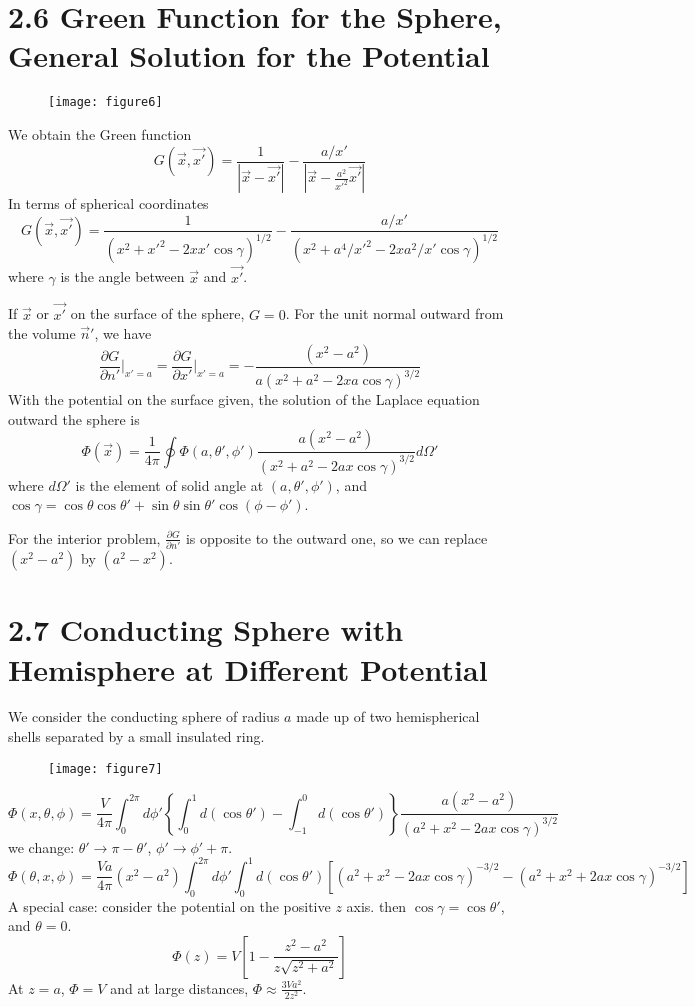 \documentclass{article}
\begin{document}
	\section*{2.6 Green Function for the Sphere, General Solution for the Potential}
	\begin{figure}[h]
		\centering
		\texttt{[image: figure6]}
		\caption{}
		\label{fig:figure6}
	\end{figure}
	
	
	We obtain the Green function
	$$
	G(\vec{x}, \vec{x'}) = \frac{1}{|\vec{x} - \vec{x'}|} - \frac{a/x'}{|\vec{x} - \frac{a^2}{x'^2}\vec{x'}|}
	$$
	In terms of spherical coordinates
	$$
	G(\vec{x}, \vec{x'}) = \frac{1}{(x^2+x'^2-2xx'\cos\gamma)^{1/2}} - \frac{a/x'}{(x^2+a^4/x'^2 - 2xa^2/x' \cos\gamma)^{1/2}}
	$$
	where $\gamma$ is the angle between $\vec{x}$ and $\vec{x'}$.
	
	If $\vec{x}$ or $\vec{x'}$ on the surface of the sphere, $G=0$. For the unit normal outward from the volume $\vec{n}'$, we have
	$$
	\frac{\partial G}{\partial n'}\bigg|_{x'=a} = \frac{\partial G}{\partial x'}\bigg|_{x'=a} = -\frac{(x^2-a^2)}{a(x^2+a^2-2xa\cos\gamma)^{3/2}}
	$$
	With the potential on the surface given, the solution of the Laplace equation outward the sphere is
	$$
	\Phi(\vec{x}) = \frac{1}{4\pi} \oint \Phi(a, \theta', \phi') \frac{a(x^2-a^2)}{(x^2+a^2-2ax\cos\gamma)^{3/2}} d\Omega'
	$$
	where $d\Omega'$ is the element of solid angle at $(a, \theta', \phi')$, and $\cos\gamma = \cos\theta\cos\theta' + \sin\theta\sin\theta'\cos(\phi-\phi')$.
	
	For the interior problem, $\frac{\partial G}{\partial n'}$ is opposite to the outward one, so we can replace $(x^2-a^2)$ by $(a^2-x^2)$.
	
	\section*{2.7 Conducting Sphere with Hemisphere at Different Potential}
	We consider the conducting sphere of radius $a$ made up of two hemispherical shells separated by a small insulated ring. 
	
	\begin{figure}[h]
		\centering
		\texttt{[image: figure7]}
		\caption{}
		\label{fig:figure7}
	\end{figure}
	
	
	$$
	\Phi(x, \theta, \phi) = \frac{V}{4\pi} \int_0^{2\pi} d\phi' \left\{ \int_0^1 d(\cos\theta') - \int_{-1}^0 d(\cos\theta') \right\} \frac{a(x^2-a^2)}{(a^2+x^2-2ax\cos\gamma)^{3/2}}
	$$
	we change: $\theta' \to \pi-\theta'$, $\phi' \to \phi'+\pi$.
	$$
	\Phi(\theta, x, \phi) = \frac{Va}{4\pi} (x^2-a^2) \int_0^{2\pi}d\phi' \int_0^1 d(\cos\theta') [ (a^2+x^2-2ax\cos\gamma)^{-3/2} - (a^2+x^2+2ax\cos\gamma)^{-3/2} ]
	$$
	A special case: consider the potential on the positive $z$ axis. then $\cos\gamma = \cos\theta'$, and $\theta=0$.
	$$
	\Phi(z) = V \left[ 1 - \frac{z^2-a^2}{z\sqrt{z^2+a^2}} \right]
	$$
	At $z=a$, $\Phi=V$ and at large distances, $\Phi \approx \frac{3Va^2}{2z^2}$.
	
\end{document}

